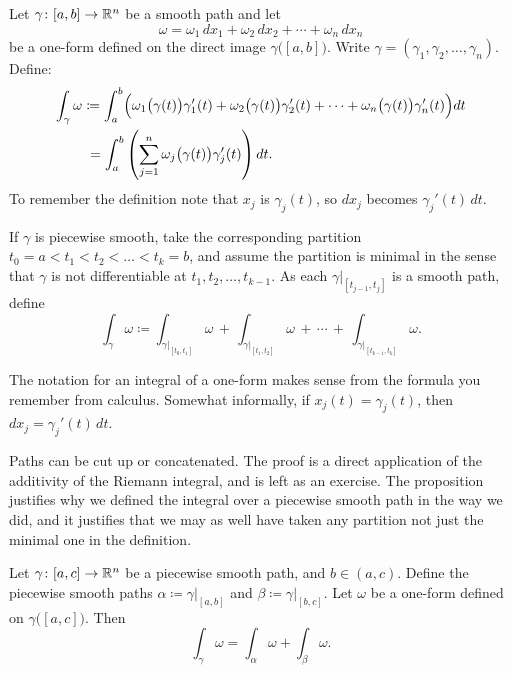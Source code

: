 \begin{defn}
Let $\gamma \colon [a,b] \to {\mathbb{R}}^n$ be a smooth path
and let
\begin{equation*}
\omega = \omega_1 \,dx_1 + \omega_2 \,dx_2 + \cdots + \omega_n \,dx_n
\end{equation*}
be a one-form defined on the direct image $\gamma\bigl([a,b]\bigr)$.
Write $\gamma = (\gamma_1,\gamma_2,\ldots,\gamma_n)$.
Define:
\begin{equation*}
\begin{split}
\int_{\gamma} \omega
& \coloneqq
\int_a^b 
\Bigl(
\omega_1\bigl(\gamma(t)\bigr) \gamma_1'(t) +
\omega_2\bigl(\gamma(t)\bigr) \gamma_2'(t) + \cdots +
\omega_n\bigl(\gamma(t)\bigr) \gamma_n'(t) \Bigr) dt
\\
&\phantom{:}=
\int_a^b 
\left(
\sum_{j=1}^n
\omega_j\bigl(\gamma(t)\bigr) \gamma_j'(t) \right) dt .
\end{split}
\end{equation*}
To remember the definition note that $x_j$ is $\gamma_j(t)$, so
$dx_j$ becomes  $\gamma_j'(t) \, dt$.

If $\gamma$ is piecewise smooth, take the corresponding partition
$t_0 = a < t_1 < t_2 < \ldots < t_k = b$, and assume the partition is
minimal
in the sense that $\gamma$ is not differentiable
at $t_1,t_2,\ldots,t_{k-1}$.  As each $\gamma|_{[t_{j-1},t_j]}$ is
a smooth path, define
\begin{equation*}
\int_{\gamma} \omega
\coloneqq
\int_{\gamma|_{[t_0,t_1]}} \omega
\,
+
\,
\int_{\gamma|_{[t_1,t_2]}} \omega
\,
+ \, \cdots \, + \,
\int_{\gamma|_{[t_{k-1},t_k]}} \omega .
\end{equation*}
\end{defn}

The notation for an integral of a one-form makes sense from the
 formula you remember from calculus.
Somewhat informally,
if $x_j(t) = \gamma_j(t)$, then $dx_j = \gamma_j'(t) \, dt$.

Paths can be cut up or concatenated.  The proof is a direct application
of the additivity of the Riemann integral, and is left as an exercise.
The proposition justifies why we defined the integral over a piecewise
smooth path in the way we did, and it justifies that we may as well
have taken any partition not just the minimal one in the definition.

\begin{prop} \label{mv:prop:pathconcat}
Let $\gamma \colon [a,c] \to {\mathbb{R}}^n$ be a piecewise smooth path,
and $b \in (a,c)$.
Define the piecewise smooth paths
$\alpha \coloneqq \gamma|_{[a,b]}$ and
$\beta \coloneqq \gamma|_{[b,c]}$.
Let $\omega$ be a one-form defined on
$\gamma\bigl([a,c]\bigr)$.  Then
\begin{equation*}
\int_{\gamma} \omega =
\int_{\alpha} \omega +
\int_{\beta} \omega .
\end{equation*}
\end{prop}



